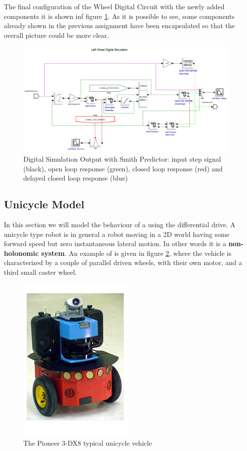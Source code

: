 The final configuration of the Wheel Digital Circuit with the newly added components it is shown inf figure \ref{fig:wheel_circuit}. As it is possible to see, some components already shown in the previous assignment have been encapsulated so that the overall picture could be more clear.

\begin{figure}[H]
  \includegraphics[scale=0.38]{FIGURES_3/Whole_Wheel.png}
  \caption[SOSModel]{Digital Simulation Output with Smith Predictor: input step signal (black), open loop response (green), closed loop response (red) and delayed closed loop response (blue)}
  \label{fig:wheel_circuit}
\end{figure}

\subsection{Unicycle Model}

In this section we will model the behaviour of a \UV{} using the differential drive. A unicycle type robot is in general a robot moving in a 2D world having some forward speed but zero instantaneous lateral motion. In other words it is a \textbf{non-holonomic system}. An example of \UV{} is given in figure \ref{fig:UV model}, where the vehicle is characterized by a couple of parallel driven wheels, with their own motor, and a third small caster wheel.

\begin{figure}[H]
  \begin{center}
  \includegraphics[scale=0.8]{FIGURES_3/unicycle.png}
    \caption[Unicycle Model]{The Pioneer 3-DX8 typical unicycle vehicle}
    \label{fig:UV model}
  \end{center}
\end{figure}

